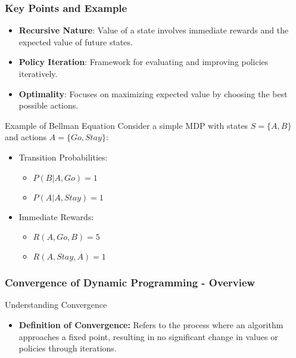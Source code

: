 \documentclass{beamer}
\begin{document}
\begin{frame}[fragile]
    \frametitle{Key Points and Example}
    \begin{itemize}
        \item \textbf{Recursive Nature}: Value of a state involves immediate rewards and the expected value of future states.
        \item \textbf{Policy Iteration}: Framework for evaluating and improving policies iteratively.
        \item \textbf{Optimality}: Focuses on maximizing expected value by choosing the best possible actions.
    \end{itemize}

    \begin{block}{Example of Bellman Equation}
        Consider a simple MDP with states \( S = \{A, B\} \) and actions \( A = \{Go, Stay\} \):
        \begin{itemize}
            \item Transition Probabilities:
            \begin{itemize}
                \item \( P(B|A,Go) = 1 \)
                \item \( P(A|A,Stay) = 1 \)
            \end{itemize}
            \item Immediate Rewards:
            \begin{itemize}
                \item \( R(A,Go,B) = 5 \)
                \item \( R(A,Stay,A) = 1 \)
            \end{itemize}
        \end{itemize}
    \end{block}
\end{frame}

\begin{frame}[fragile]
    \frametitle{Convergence of Dynamic Programming - Overview}
    \begin{block}{Understanding Convergence}
        \begin{itemize}
            \item \textbf{Definition of Convergence:} Refers to the process where an algorithm approaches a fixed point, resulting in no significant change in values or policies through iterations.
        \end{itemize}
    \end{block}
\end{frame}
\end{document}
